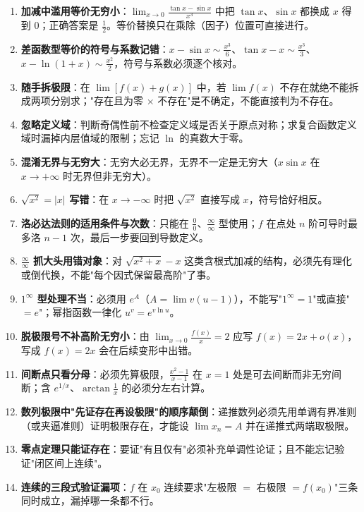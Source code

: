 \documentclass[11pt,openany,UTF8]{ctexbook}
\begin{document}
\begin{enumerate}
\item \textbf{加减中滥用等价无穷小}：$\lim_{x\to 0}\frac{\tan x-\sin x}{x^{3}}$ 中把 $\tan x$、$\sin x$ 都换成 $x$ 得到 $0$；正确答案是 $\frac12$。等价替换只在乘除（因子）位置可直接进行。
\item \textbf{差函数型等价的符号与系数记错}：$x-\sin x\sim\frac{x^{3}}{6}$、$\tan x-x\sim\frac{x^{3}}{3}$、$x-\ln(1+x)\sim\frac{x^{2}}{2}$，符号与系数必须逐个核对。
\item \textbf{随手拆极限}：在 $\lim[f(x)+g(x)]$ 中，若 $\lim f(x)$ 不存在就绝不能拆成两项分别求；"存在且为零 $\times$ 不存在"是不确定，不能直接判为不存在。
\item \textbf{忽略定义域}：判断奇偶性前不检查定义域是否关于原点对称；求复合函数定义域时漏掉内层值域的限制；忘记 $\ln$ 的真数大于零。
\item \textbf{混淆无界与无穷大}：无穷大必无界，无界不一定是无穷大（$x\sin x$ 在 $x\to+\infty$ 时无界但非无穷大）。
\item \textbf{$\sqrt{x^{2}}=\vert x\vert$ 写错}：在 $x\to-\infty$ 时把 $\sqrt{x^{2}}$ 直接写成 $x$，符号恰好相反。
\item \textbf{洛必达法则的适用条件与次数}：只能在 $\frac00$、$\frac{\infty}{\infty}$ 型使用；$f$ 在点处 $n$ 阶可导时最多洛 $n-1$ 次，最后一步要回到导数定义。
\item \textbf{$\frac{\infty}{\infty}$ 抓大头用错对象}：对 $\sqrt{x^{2}+x}-x$ 这类含根式加减的结构，必须先有理化或倒代换，不能"每个因式保留最高阶"了事。
\item \textbf{$1^{\infty}$ 型处理不当}：必须用 $e^{A}$（$A=\lim v(u-1)$），不能写"$1^{\infty}=1$"或直接"$=e$"；幂指函数一律化 $u^{v}=e^{v\ln u}$。
\item \textbf{脱极限号不补高阶无穷小}：由 $\lim_{x\to 0}\frac{f(x)}{x}=2$ 应写 $f(x)=2x+o(x)$，写成 $f(x)=2x$ 会在后续变形中出错。
\item \textbf{间断点只看分母}：必须先算极限，$\frac{x^{2}-1}{x-1}$ 在 $x=1$ 处是可去间断而非无穷间断；含 $e^{1/x}$、$\arctan\frac1x$ 的必须分左右计算。
\item \textbf{数列极限中"先证存在再设极限"的顺序颠倒}：递推数列必须先用单调有界准则（或夹逼准则）证明极限存在，才能设 $\lim x_n=A$ 并在递推式两端取极限。
\item \textbf{零点定理只能证存在}：要证"有且仅有"必须补充单调性论证；且不能忘记验证"闭区间上连续"。
\item \textbf{连续的三段式验证漏项}：$f$ 在 $x_0$ 连续要求"左极限 $=$ 右极限 $=f(x_0)$"三条同时成立，漏掉哪一条都不行。
\end{enumerate}
\end{document}
